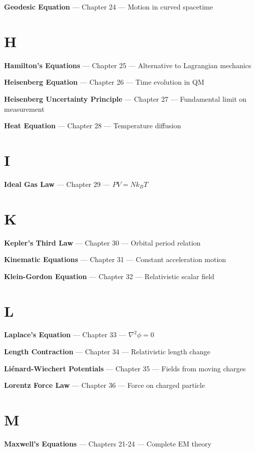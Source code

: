\textbf{Geodesic Equation} --- Chapter 24 --- Motion in curved spacetime

\section*{H}

\textbf{Hamilton's Equations} --- Chapter 25 --- Alternative to Lagrangian mechanics

\textbf{Heisenberg Equation} --- Chapter 26 --- Time evolution in QM

\textbf{Heisenberg Uncertainty Principle} --- Chapter 27 --- Fundamental limit on measurement

\textbf{Heat Equation} --- Chapter 28 --- Temperature diffusion

\section*{I}

\textbf{Ideal Gas Law} --- Chapter 29 --- $PV = Nk_BT$

\section*{K}

\textbf{Kepler's Third Law} --- Chapter 30 --- Orbital period relation

\textbf{Kinematic Equations} --- Chapter 31 --- Constant acceleration motion

\textbf{Klein-Gordon Equation} --- Chapter 32 --- Relativistic scalar field

\section*{L}

\textbf{Laplace's Equation} --- Chapter 33 --- $\nabla^2 \phi = 0$

\textbf{Length Contraction} --- Chapter 34 --- Relativistic length change

\textbf{Liénard-Wiechert Potentials} --- Chapter 35 --- Fields from moving charges

\textbf{Lorentz Force Law} --- Chapter 36 --- Force on charged particle

\section*{M}

\textbf{Maxwell's Equations} --- Chapters 21-24 --- Complete EM theory

